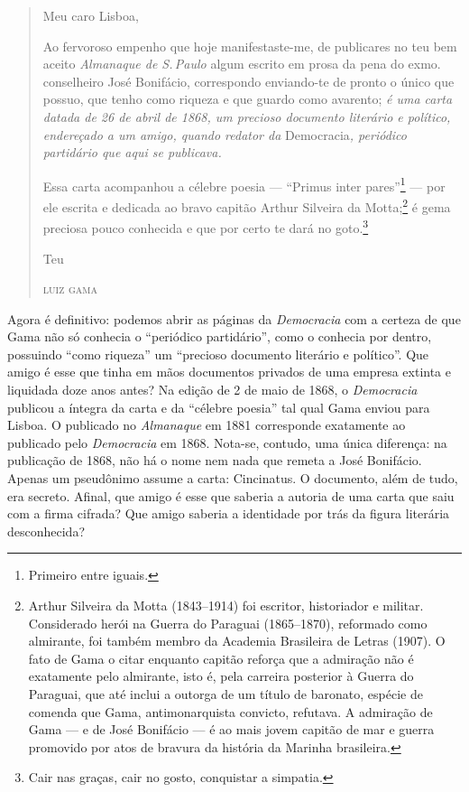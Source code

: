 \begin{quote}
\forceindent{}Meu caro Lisboa,

Ao fervoroso empenho que hoje manifestaste-me, de publicares no teu bem
aceito \emph{Almanaque de S.\,Paulo} algum escrito em prosa da pena do
exmo. conselheiro José Bonifácio, correspondo enviando-te de pronto o
único que possuo, que tenho como riqueza e que guardo como avarento;
\textit{é uma carta datada de 26 de abril de 1868, um precioso documento
literário e político, endereçado a um amigo, quando redator da}
Democracia\textit{, periódico partidário que aqui se publicava.}

Essa carta acompanhou a célebre poesia --- ``Primus inter pares''\footnote{Primeiro entre iguais.} --- por ele escrita e dedicada ao bravo capitão
Arthur Silveira da Motta;\footnote{Arthur Silveira da Motta (1843--1914)
  foi escritor, historiador e militar. Considerado herói na Guerra do
  Paraguai (1865--1870), reformado como almirante, foi também membro da
  Academia Brasileira de Letras (1907). O fato de Gama o citar enquanto
  capitão reforça que a admiração não é exatamente pelo almirante, isto
  é, pela carreira posterior à Guerra do Paraguai, que até inclui a
  outorga de um título de baronato, espécie de comenda que Gama,
  antimonarquista convicto, refutava. A admiração de Gama --- e de José
  Bonifácio --- é ao mais jovem capitão de mar e guerra promovido por
  atos de bravura da história da Marinha brasileira.} é gema preciosa
pouco conhecida e que por certo te dará no goto.\footnote{Cair nas
  graças, cair no gosto, conquistar a simpatia.}

\begin{flushright}
Teu

\textsc{luiz gama}
\end{flushright}
\end{quote}

Agora é definitivo: podemos abrir as páginas da \emph{Democracia} com a
certeza de que Gama não só conhecia o ``periódico partidário'', como o
conhecia por dentro, possuindo ``como riqueza'' um ``precioso documento
literário e político''. Que amigo é esse que tinha em mãos documentos
privados de uma empresa extinta e liquidada doze anos antes? Na edição
de 2 de maio de 1868, o \emph{Democracia} publicou a íntegra da carta e
da ``célebre poesia'' tal qual Gama enviou para Lisboa. O publicado no
\emph{Almanaque} em 1881 corresponde exatamente ao publicado pelo
\emph{Democracia} em 1868. Nota-se, contudo, uma única diferença: na
publicação de 1868, não há o nome nem nada que remeta a José Bonifácio.
Apenas um pseudônimo assume a carta: Cincinatus. O documento,
além de tudo, era secreto. Afinal, que amigo é esse que saberia a
autoria de uma carta que saiu com a firma cifrada? Que amigo saberia a
identidade por trás da figura literária desconhecida?

